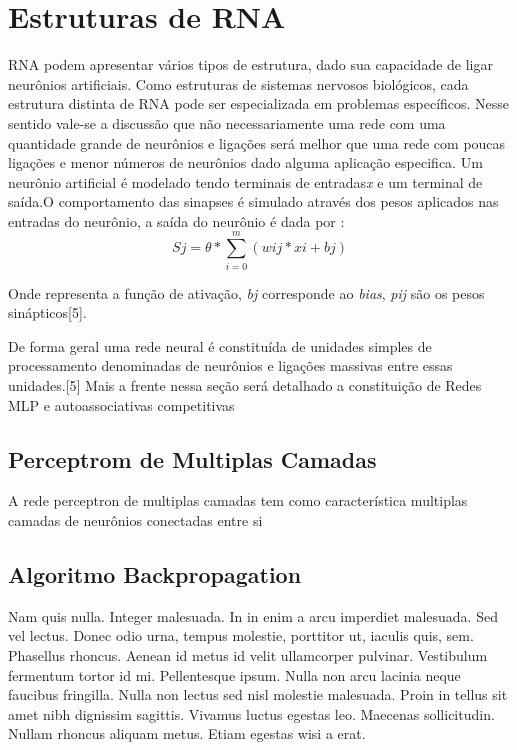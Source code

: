 \section{Estruturas de RNA}
RNA podem apresentar vários tipos de estrutura, dado sua capacidade de ligar neurônios artificiais. Como estruturas de sistemas nervosos biológicos, cada estrutura distinta de RNA pode ser especializada em problemas específicos. Nesse sentido vale-se a discussão que não necessariamente uma rede com uma quantidade grande de neurônios e ligações será melhor que uma rede com poucas ligações e menor números de neurônios dado alguma aplicação especifica.
Um neurônio artificial é modelado tendo terminais de entradas\textit{x} e um terminal de saída.O comportamento das sinapses é simulado através dos pesos aplicados nas entradas do neurônio, a saída do neurônio é dada por : 
\begin{equation}
Sj = \theta *\sum_{i=0}^{m} (wij*xi+bj)
\end{equation}

Onde  representa a função de ativação, \textit{bj} corresponde ao \textit{bias}, \textit{pij} são os pesos sinápticos[5].

De forma geral uma rede neural é constituída de unidades simples de processamento denominadas de neurônios e ligações massivas entre essas unidades.[5]
Mais a frente nessa seção será detalhado a constituição de Redes MLP e autoassociativas competitivas


\subsection{Perceptrom de Multiplas Camadas}

A rede perceptron de multiplas camadas tem como característica multiplas camadas de neurônios conectadas entre si  

\subsection{Algoritmo Backpropagation}

Nam quis nulla. Integer malesuada. In in enim a arcu imperdiet malesuada. Sed vel lectus. Donec odio urna, tempus molestie, porttitor ut, iaculis quis, sem. Phasellus rhoncus. Aenean id metus id velit ullamcorper pulvinar. Vestibulum fermentum tortor id mi. Pellentesque ipsum. Nulla non arcu lacinia neque faucibus fringilla. Nulla non lectus sed nisl molestie malesuada. Proin in tellus sit amet nibh dignissim sagittis. Vivamus luctus egestas leo. Maecenas sollicitudin. Nullam rhoncus aliquam metus. Etiam egestas wisi a erat.

